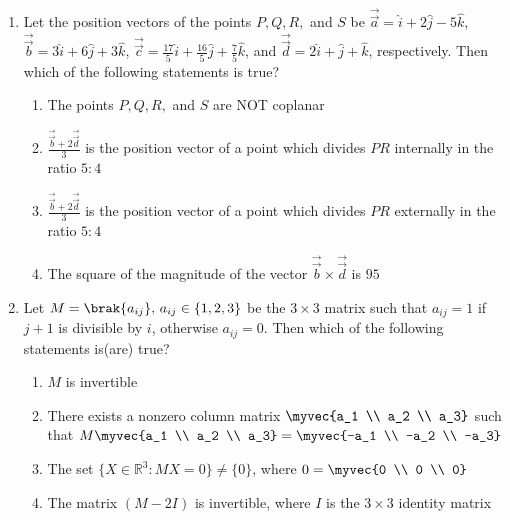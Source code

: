 \documentclass[12pt,a4paper]{article}
\begin{document}
\begin{enumerate}
\item Let the position vectors of the points $P, Q, R,$ and $S$ be
$\vec{\overrightarrow{a}} = \hat{i} + 2\hat{j} - 5\hat{k}$, $\vec{\overrightarrow{b}} = 3\hat{i} + 6\hat{j} + 3\hat{k}$, $\vec{\overrightarrow{c}} = \frac{17}{5}\hat{i} + \frac{16}{5}\hat{j} + \frac{7}{5}\hat{k}$, and $\vec{\overrightarrow{d}} = 2\hat{i} + \hat{j} + \hat{k}$, respectively. Then which of the following statements is true?
\begin{enumerate}
\item The points $P, Q, R,$ and $S$ are NOT coplanar
\item $\frac{\vec{\overrightarrow{b}} + 2\vec{\overrightarrow{d}}}{3}$ is the position vector of a point which divides $PR$ internally in the ratio $5:4$
\item $\frac{\vec{\overrightarrow{b}} + 2\vec{\overrightarrow{d}}}{3}$ is the position vector of a point which divides $PR$ externally in the ratio $5:4$
\item The square of the magnitude of the vector $\vec{\overrightarrow{b}} \times \vec{\overrightarrow{d}}$ is $95$
\end{enumerate}


\item Let $M = \brak{ a_{ij} }, \, a_{ij} \in \{1,2,3\}$ be the $3 \times 3$ matrix such that $a_{ij} = 1$ if $j + 1$ is divisible by $i$, otherwise $a_{ij} = 0$. Then which of the following statements is(are) true?  
\begin{enumerate}  
\item $M$ is invertible  
\item There exists a nonzero column matrix $\myvec{a_1 \\ a_2 \\ a_3}$ such that $M \myvec{a_1 \\ a_2 \\ a_3} = \myvec{-a_1 \\ -a_2 \\ -a_3}$  
\item The set $\{ X \in \mathbb{R}^3 : MX = 0 \} \neq \{0\}$, where \quad $0= \myvec{0 \\ 0 \\ 0}$  
\item The matrix $(M - 2I)$ is invertible, where $I$ is the $3 \times 3$ identity matrix  
\end{enumerate}



\end{enumerate}
\end{document}
